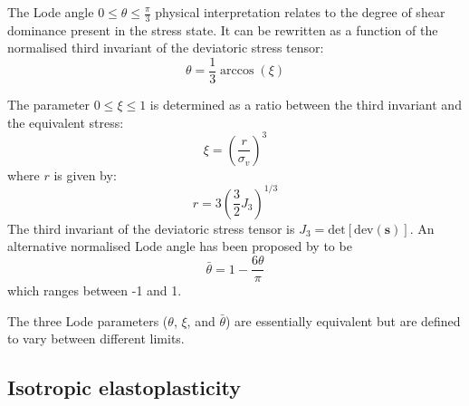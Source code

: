 \documentclass[sn-mathphys,Numbered,draft]{sn-jnl}%
\begin{document}
The Lode angle $0 \leq \theta \leq \frac{\pi}{3}$ physical interpretation relates to the degree of shear dominance present in the stress state.
It can be rewritten as a function of the normalised third invariant of the deviatoric stress tensor:
\begin{equation}
    \theta=\frac{1}{3} \arccos\left(\xi\right)
\end{equation}

The parameter $0 \leq \xi \leq 1$ is determined as a ratio between the third invariant and the equivalent stress:
\begin{equation}
	\xi = \left(\frac{r}{\sigma_{v}}\right)^3
\end{equation}
where $r$ is given by:
\begin{equation}
	r  = 3 \left(\frac{3}{2}J_3\right)^{1/3} %
\end{equation}
The third invariant of the deviatoric stress tensor is $J_3 = \text{det}[\text{dev}(\mathbf{s})]$.
An alternative normalised Lode angle has been proposed by \citet{bai_new_2008} to be
\begin{equation}
	\bar{\theta}=1-\frac{6\theta}{\pi}	
\end{equation}
which ranges between -1 and 1.

The three Lode parameters ($\theta$, $\xi$, and $\bar{\theta}$) are essentially equivalent but are defined to vary between different limits.


\subsection{Isotropic elastoplasticity}

\end{document}
